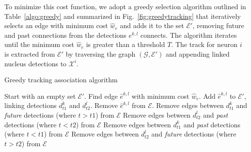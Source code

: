 
To minimize this cost function,  we adopt a greedy selection algorithm
outlined     in    Table~\ref{algo:greedy}    and     summarized    in
Fig.~\ref{fig:greedytracking}  that iteratively  selects an  edge with
minimum  cost  $\hat w_e$  and  adds  it  to the  set  $\mathcal{E}'$,
removing  future   and  past   connections  from  the   detections  $e^{k,l}$
connects. The algorithm iterates until  the minimum cost $\hat w_e$ is
greater than  a threshold $T$. The  track for neuron  $i$ is extracted
from       $\mathcal{E}'$      by      traversing       the      graph
$(\mathcal{G},\mathcal{E}')$  and appending linked  nucleus detections
to $\mathcal{X}^i$.


\vspace{-5mm}
\begin{algorithm}[h!]
\caption{Greedy tracking association algorithm}
\begin{algorithmic}[100]
\STATE Start with an empty set $\mathcal{E}'$.
\REPEAT
\STATE Find edge $\hat e^{k,l}$ with minimum cost $\hat w_e$.
\STATE Add $\hat e^{k,l}$ to $\mathcal{E}'$, linking detections $d^k_{t1}$ and $d^l_{t2}$.
\STATE Remove $\hat e^{k,l}$ from $\mathcal{E}$.
\STATE Remove edges between $d^k_{t1}$ and {\em future} detections (where $t > t1$) from $\mathcal{E}$
\STATE Remove edges between $d^l_{t2}$ and {\em past} detections (where $t < t2$) from $\mathcal{E}$
\ELSE
\STATE Remove edges between $d^k_{t1}$ and {\em past} detections (where $t < t1$) from $\mathcal{E}$
\STATE Remove edges between $d^l_{t2}$ and {\em future} detections (where $t > t2$) from $\mathcal{E}$
\ENDIF
{}
\end{algorithmic}
\label{algo:greedy}
\end{algorithm}


